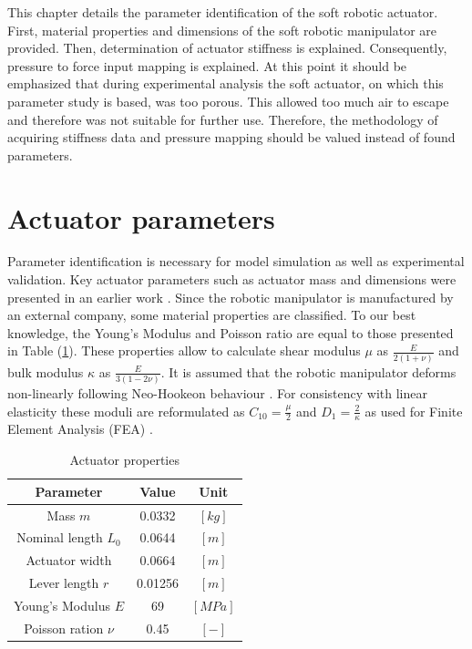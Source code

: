 \label{chap3}

This chapter details the parameter identification of the soft robotic actuator. First, material properties and dimensions of the soft robotic manipulator are provided. Then, determination of actuator stiffness is explained. Consequently, pressure to force input mapping is explained. At this point it should be emphasized that during experimental analysis the soft actuator, on which this parameter study is based, was too porous. This allowed too much air to escape and therefore was not suitable for further use. Therefore, the methodology of acquiring stiffness data and pressure mapping should be valued instead of found parameters. 


\section{Actuator parameters}

Parameter identification is necessary for model simulation as well as experimental validation. Key actuator parameters such as actuator mass and dimensions were presented in an earlier work \cite{berkers}. Since the robotic manipulator is manufactured by an external company, some material properties are classified. To our best knowledge, the Young's Modulus and Poisson ratio are equal to those presented in Table (\ref{tab4:parameters}). These properties allow to calculate shear modulus $\mu$ as $\frac{E}{2(1+\nu)}$ and bulk modulus $\kappa$ as $\frac{E}{3(1-2\nu)}$. It is assumed that the robotic manipulator deforms non-linearly following Neo-Hookeon behaviour \cite{Caasenbrood2020StiffnessModel}. For consistency with linear elasticity these moduli are reformulated as $C_{10} = \frac{\mu}{2}$ and $D_{1} = \frac{2}{\kappa}$ as used for Finite Element Analysis (FEA) \cite{neohookean}. 


\begin{table}[H]
    \centering
    \caption{Actuator properties}
    \begin{tabular}{|c|c|c|} \hline
      \textbf{Parameter}   &  \textbf{Value} & \textbf{Unit} \\ \hline
      Mass $m$             &    0.0332       & $[kg]$ \\ 
      Nominal length $L_0$ &    0.0644       & $[m]$  \\ 
      Actuator width       &    0.0664       & $[m]$  \\ 
      Lever length $r$     &    0.01256      & $[m]$  \\ 
      Young's Modulus $E$  &    69           & $[MPa]$\\ 
      Poisson ration $\nu$ &    0.45         & $[-]$ \\ \hline
    \end{tabular}
    \label{tab4:parameters}
\end{table}



